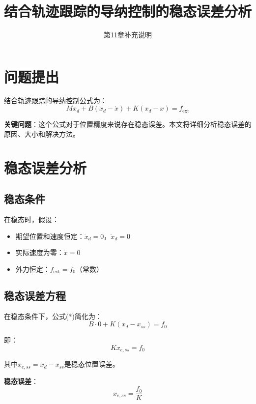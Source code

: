 \documentclass[12pt,a4paper]{article}
\title{结合轨迹跟踪的导纳控制的稳态误差分析}
\author{第11章补充说明}
\date{}
\begin{document}
\maketitle

\section{问题提出}

结合轨迹跟踪的导纳控制公式为：
\begin{equation}
M\ddot{x}_d + B(\dot{x}_d - \dot{x}) + K(x_d - x) = f_{\text{ext}} \tag{*}
\end{equation}

\textbf{关键问题}：这个公式对于位置精度来说存在稳态误差。本文将详细分析稳态误差的原因、大小和解决方法。

\section{稳态误差分析}

\subsection{稳态条件}

在稳态时，假设：
\begin{itemize}
\item 期望位置和速度恒定：$\dot{x}_d = 0$，$\ddot{x}_d = 0$
\item 实际速度为零：$\dot{x} = 0$
\item 外力恒定：$f_{\text{ext}} = f_0$（常数）
\end{itemize}

\subsection{稳态误差方程}

在稳态条件下，公式(*)简化为：
\begin{equation}
B \cdot 0 + K(x_d - x_{ss}) = f_0
\end{equation}

即：
\begin{equation}
K x_{e,ss} = f_0
\end{equation}

其中$x_{e,ss} = x_d - x_{ss}$是稳态位置误差。

\textbf{稳态误差}：
\begin{equation}
x_{e,ss} = \frac{f_0}{K} \tag{1}
\end{equation}
\end{document}
